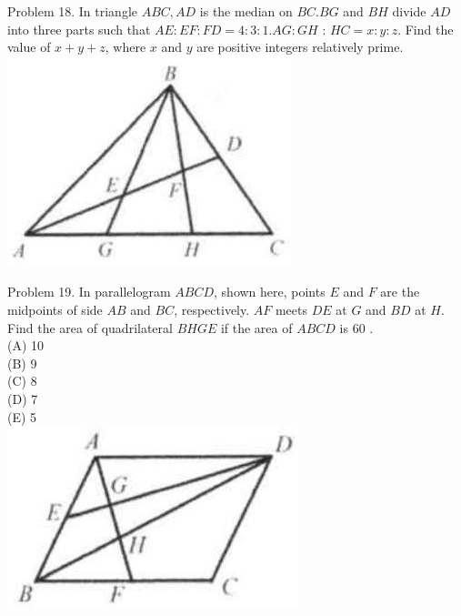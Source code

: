 \documentclass[10pt]{article}
\begin{document}
Problem 18. In triangle \(A B C, A D\) is the median on \(B C . B G\) and \(B H\) divide \(A D\) into three parts such that \(A E: E F: F D=4: 3: 1 . A G: G H\) : \(H C=x: y: z\). Find the value of \(x+y+z\), where \(x\) and \(y\) are positive integers relatively prime.\\
\includegraphics[max width=\textwidth, center]{2025_04_17_97bc1f7e44d93c271a88g-129(2)}

Problem 19. In parallelogram \(A B C D\), shown here, points \(E\) and \(F\) are the midpoints of side \(A B\) and \(B C\), respectively. \(A F\) meets \(D E\) at \(G\) and \(B D\) at \(H\). Find the area of quadrilateral \(B H G E\) if the area of \(A B C D\) is 60 .\\
(A) 10\\
(B) 9\\
(C) 8\\
(D) 7\\
(E) 5\\
\includegraphics[max width=\textwidth, center]{2025_04_17_97bc1f7e44d93c271a88g-129(1)}
\end{document}
